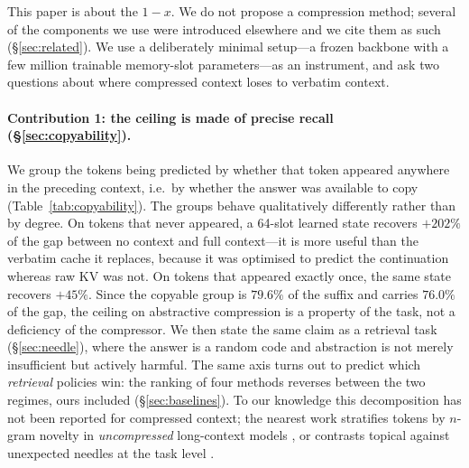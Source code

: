 \documentclass[11pt]{article}
\begin{document}
This paper is about the $1-x$. We do not propose a compression method; several
of the components we use were introduced elsewhere and we cite them as such
(\S\ref{sec:related}). We use a deliberately minimal setup---a frozen backbone
with a few million trainable memory-slot parameters---as an instrument, and ask
two questions about where compressed context loses to verbatim context.

\paragraph{Contribution 1: the ceiling is made of precise recall
(\S\ref{sec:copyability}).}
We group the tokens being predicted by whether that token appeared anywhere in
the preceding context, i.e.\ by whether the answer was available to copy
(Table~\ref{tab:copyability}). The
groups behave qualitatively differently rather than by degree. On tokens that
never appeared, a 64-slot learned state recovers $+202\%$ of the gap between no
context and full context---it is more useful than the verbatim cache it replaces,
because it was optimised to predict the continuation whereas raw KV was not. On
tokens that appeared exactly once, the same state recovers $+45\%$. Since the
copyable group is $79.6\%$ of the suffix and carries $76.0\%$ of the gap, the
ceiling on abstractive compression is a property of the task, not a deficiency
of the compressor. We then state the same claim as a retrieval task
(\S\ref{sec:needle}), where the answer is a random code and abstraction is not
merely insufficient but actively harmful. The same axis turns out to predict
which \emph{retrieval} policies win: the ranking of four methods reverses
between the two regimes, ours included (\S\ref{sec:baselines}). To our knowledge this decomposition has not been reported for
compressed context; the nearest work stratifies tokens by $n$-gram novelty in
\emph{uncompressed} long-context models \citep{tokensbenefit}, or contrasts
topical against unexpected needles at the task level \citep{gistboundary}.
\end{document}
